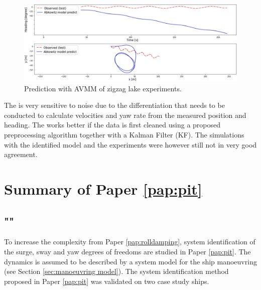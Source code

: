 \begin{figure}[H]
    \centering
    \includegraphics[width=\linewidth]{kappa/images/daiyong_extrapolation.jpeg}
    \caption{Prediction with AVMM of zigzag lake experiments.}
    \label{fig:daiyong_extrapolation}
\end{figure}

\noindent The  is very sensitive to noise due to the differentiation that needs to be conducted to calculate velocities and yaw rate from the measured position and heading. The  works better if the data is first cleaned using a proposed preprocessing algorithm together with a Kalman Filter (KF). The simulations with the identified model and the experiments were however still not in very good agreement.     

\section{Summary of Paper \ref{pap:pit}}
\subsection*{""}
To increase the complexity from Paper \ref{pap:rolldamping}, system identification of the surge, sway and yaw
degrees of freedoms are studied in Paper \ref{pap:pit}. The dynamics is assumed to be described by a system model for the ship manoeuvring (see Section \ref{sec:manoeuvring model}). The system identification method proposed in Paper \ref{pap:pit} was validated on two case study ships.

